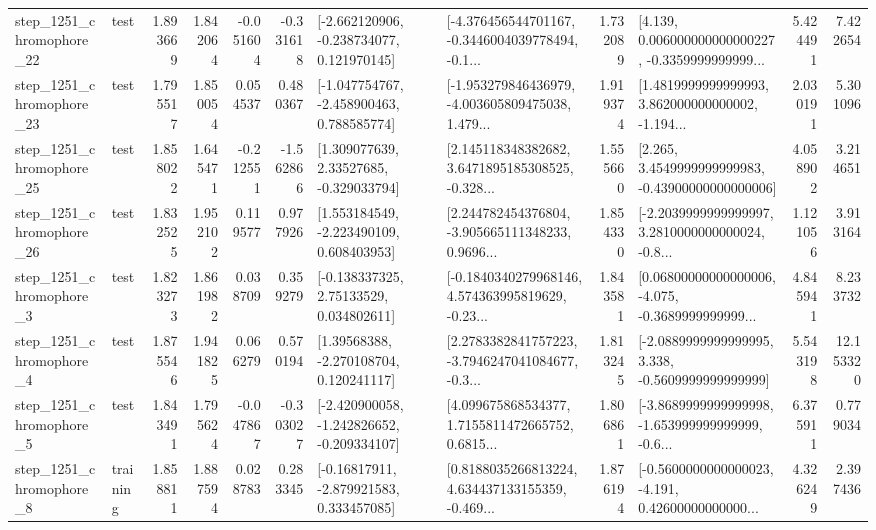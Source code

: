 \begin{tabular}{llrrrrllrlrr}
 step\_1251\_chromophore\_22 &      test &      1.893669 &    1.842064 &     -0.051604 & -0.331618 &   [-2.662120906, -0.238734077, 0.121970145] &  [-4.376456544701167, -0.3446004039778494, -0.1... &       1.732089 &  [4.139, 0.006000000000000227, -0.3359999999999... &            5.424491 &          7.422654 \\
 step\_1251\_chromophore\_23 &      test &      1.795517 &    1.850054 &      0.054537 &  0.480367 &   [-1.047754767, -2.458900463, 0.788585774] &  [-1.953279846436979, -4.003605809475038, 1.479... &       1.919374 &  [1.4819999999999993, 3.862000000000002, -1.194... &            2.030191 &          5.301096 \\
 step\_1251\_chromophore\_25 &      test &      1.858022 &    1.645471 &     -0.212551 & -1.562866 &     [1.309077639, 2.33527685, -0.329033794] &  [2.145118348382682, 3.6471895185308525, -0.328... &       1.555660 &  [2.265, 3.4549999999999983, -0.43900000000000006] &            4.058902 &          3.214651 \\
 step\_1251\_chromophore\_26 &      test &      1.832525 &    1.952102 &      0.119577 &  0.977926 &    [1.553184549, -2.223490109, 0.608403953] &  [2.244782454376804, -3.905665111348233, 0.9696... &       1.854330 &  [-2.2039999999999997, 3.2810000000000024, -0.8... &            1.121056 &          3.913164 \\
  step\_1251\_chromophore\_3 &      test &      1.823273 &    1.861982 &      0.038709 &  0.359279 &     [-0.138337325, 2.75133529, 0.034802611] &  [-0.1840340279968146, 4.574363995819629, -0.23... &       1.843581 &  [0.06800000000000006, -4.075, -0.3689999999999... &            4.845941 &          8.233732 \\
  step\_1251\_chromophore\_4 &      test &      1.875546 &    1.941825 &      0.066279 &  0.570194 &     [1.39568388, -2.270108704, 0.120241117] &  [2.2783382841757223, -3.7946247041084677, -0.3... &       1.813245 &  [-2.0889999999999995, 3.338, -0.5609999999999999] &            5.543198 &         12.153320 \\
  step\_1251\_chromophore\_5 &      test &      1.843491 &    1.795624 &     -0.047867 & -0.303027 &  [-2.420900058, -1.242826652, -0.209334107] &  [4.099675868534377, 1.7155811472665752, 0.6815... &       1.806861 &  [-3.8689999999999998, -1.653999999999999, -0.6... &            6.375911 &          0.779034 \\
  step\_1251\_chromophore\_8 &  training &      1.858811 &    1.887594 &      0.028783 &  0.283345 &    [-0.16817911, -2.879921583, 0.333457085] &  [0.8188035266813224, 4.634437133155359, -0.469... &       1.876194 &  [-0.5600000000000023, -4.191, 0.42600000000000... &            4.326249 &          2.397436 \\

\end{tabular}

